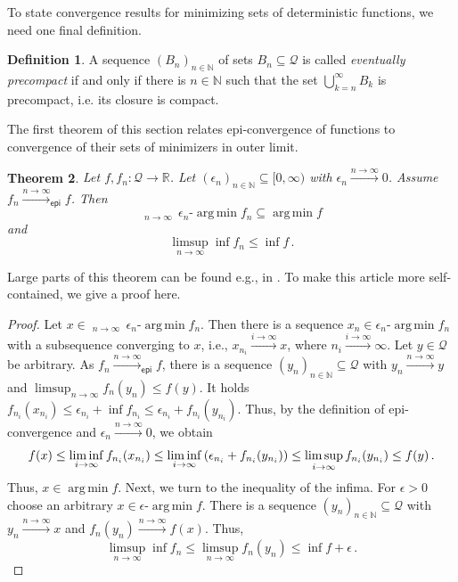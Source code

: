 \documentclass{scrartcl}
\renewcommand{\subset}{\subseteq}
\newcommand{\N}{\mathbb{N}}
\newcommand{\R}{\mathbb{R}}
\newcommand{\equationFullstop}{\, .}
\newcommand{\eqfs}{\equationFullstop}
\DeclareMathOperator*{\argmin}{arg\,min}
\DeclareMathOperator*{\outerlim}{lim\, \overline{sup}}
\def\MS{\mathcal{Q}}\def\epi{\mathsf{epi}}\def\aec{\mathsf{aec}}\def\alsec{\mathsf{alsec}}\def\aecp{\mathsf{aec}_P}\def\Hausdorff{\mathsf{H}}\def\Haus{\mathsf{H}}\def\ubs{\mathsf{ubs}}\newcommand{\epiconv}[1]{\xrightarrow{#1\to\infty}_\epi}\newcommand{\hausconv}[1]{\xrightarrow{#1\to\infty}_\Hausdorff}\newcommand{\ubsconv}[1]{\xrightarrow{#1\to\infty}_\ubs}\newcommand{\ol}[2]{\overline{#1,\!#2}}
\theoremstyle{plain}\newtheorem{theorem}{Theorem}[section]
\theoremstyle{definition}
\newtheorem{definition}[theorem]{Definition}
\theoremstyle{remark}
\begin{document}
To state convergence results for minimizing sets of deterministic functions, we need one final definition.
\begin{definition}
	A sequence $(B_n)_{n\in\N}$ of sets $B_n \subset \MS$ is called \emph{eventually precompact} if and only if there is $n\in\N$ such that the set 
$\bigcup_{k=n}^\infty B_k$ is precompact, i.e. its closure is compact.
\end{definition}
The first theorem of this section relates epi-convergence of functions to convergence of their sets of minimizers in outer limit.
\begin{theorem}\label{thm:convOfMini}
	Let $f,f_n \colon \MS\to\R$. Let $(\epsilon_n)_{n\in\N}\subset [0,\infty)$ with $\epsilon_n \xrightarrow{n\to\infty}0$. 
		Assume $f_n\epiconv{n}f$.
		Then
		\begin{equation*}
			\outerlim_{n\to\infty}\, \epsilon_n\text{-}\argmin f_n \subset \argmin f
		\end{equation*}
		and
		\begin{equation*}
			\limsup_{n\to\infty} \inf f_n \leq \inf f
			\eqfs
		\end{equation*}
\end{theorem}
Large parts of this theorem can be found e.g., in \cite[chapter 7]{rockafellar98}. To make this article more self-contained, we give a proof here.
\begin{proof}
		Let $x \in \outerlim_{n\to\infty}\, \epsilon_n\text{-}\argmin f_n$. Then there is a sequence $x_n \in \epsilon_{n}\text{-}\argmin f_{n}$ with a subsequence converging to $x$, i.e., $x_{n_i} \xrightarrow{i\to\infty} x$, where $n_i\xrightarrow{i\to\infty}\infty$.
		Let $y\in\MS$ be arbitrary. As $f_n\epiconv{n}f$, there is a sequence $(y_n)_{n\in\N}\subset\MS$ with $y_n\xrightarrow{n\to\infty}y$ and $\limsup_{n\to\infty} f_n(y_n) \leq f(y)$. 
		It holds $f_{n_i}(x_{n_i}) \leq \epsilon_{n_i} + \inf f_{n_i} \leq \epsilon_{n_i} + f_{n_i}(y_{n_i})$. Thus, by the definition of epi-convergence and $\epsilon_n \xrightarrow{n\to\infty} 0$, we obtain
		\begin{equation*}
		f(x) 
		\leq 
		\liminf_{i\to\infty} f_{n_i}(x_{n_i}) 
		\leq 
		\liminf_{i\to\infty} \br{\epsilon_{n_i} + f_{n_i}(y_{n_i})}
		\leq 
		\limsup_{i\to\infty} f_{n_i}(y_{n_i}) 
		\leq 
		f(y)\eqfs
		\end{equation*}		
		Thus, $x \in \argmin f$.
		Next, we turn to the inequality of the infima. For $\epsilon > 0$ choose an arbitrary $x\in\epsilon\text{-}\argmin f$. There is a sequence $(y_n)_{n\in\N}\subset\MS$ with $y_n\xrightarrow{n\to\infty} x$ and $f_n(y_n)\xrightarrow{n\to\infty} f(x)$. Thus,
		\begin{equation*}
			\limsup_{n\to\infty} \inf f_n \leq \limsup_{n\to\infty} f_n(y_n) \leq \inf f + \epsilon
			\eqfs
		\end{equation*}
\end{proof}
\end{document}

